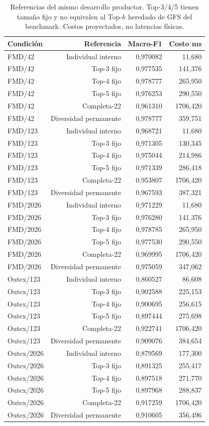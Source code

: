 \begin{table}[!htbp]\centering\fontsize{8}{10}\selectfont\setlength{\tabcolsep}{3pt}
\caption{Referencias del mismo desarrollo productor. Top-3/4/5 tienen tamaño fijo y no equivalen al Top-$k$ heredado de GFS del benchmark. Costos proyectados, no latencias físicas.}
\label{tab:replica-referencias}
\begin{tabular}{@{}lrrr@{}}
\toprule
Condición & Referencia & Macro-F1 & Costo ms\\
\midrule
FMD/42 & Individual interno & 0,970082 & 11,680\\
FMD/42 & Top-3 fijo & 0,977535 & 141,376\\
FMD/42 & Top-4 fijo & 0,978777 & 265,950\\
FMD/42 & Top-5 fijo & 0,976253 & 290,550\\
FMD/42 & Completa-22 & 0,961310 & 1706,420\\
FMD/42 & Diversidad permanente & 0,978777 & 359,751\\
FMD/123 & Individual interno & 0,968721 & 11,680\\
FMD/123 & Top-3 fijo & 0,971305 & 130,345\\
FMD/123 & Top-4 fijo & 0,975044 & 214,986\\
FMD/123 & Top-5 fijo & 0,971339 & 286,418\\
FMD/123 & Completa-22 & 0,953807 & 1706,420\\
FMD/123 & Diversidad permanente & 0,967593 & 387,321\\
FMD/2026 & Individual interno & 0,971229 & 11,680\\
FMD/2026 & Top-3 fijo & 0,976280 & 141,376\\
FMD/2026 & Top-4 fijo & 0,978785 & 265,950\\
FMD/2026 & Top-5 fijo & 0,977530 & 290,550\\
FMD/2026 & Completa-22 & 0,969995 & 1706,420\\
FMD/2026 & Diversidad permanente & 0,975059 & 347,062\\
Outex/123 & Individual interno & 0,860527 & 86,608\\
Outex/123 & Top-3 fijo & 0,902588 & 225,153\\
Outex/123 & Top-4 fijo & 0,900695 & 256,615\\
Outex/123 & Top-5 fijo & 0,897444 & 275,698\\
Outex/123 & Completa-22 & 0,922741 & 1706,420\\
Outex/123 & Diversidad permanente & 0,909076 & 384,654\\
Outex/2026 & Individual interno & 0,879569 & 177,300\\
Outex/2026 & Top-3 fijo & 0,891325 & 255,417\\
Outex/2026 & Top-4 fijo & 0,897518 & 271,770\\
Outex/2026 & Top-5 fijo & 0,897968 & 288,837\\
Outex/2026 & Completa-22 & 0,917259 & 1706,420\\
Outex/2026 & Diversidad permanente & 0,910605 & 356,496\\
\bottomrule
\end{tabular}
\end{table}
